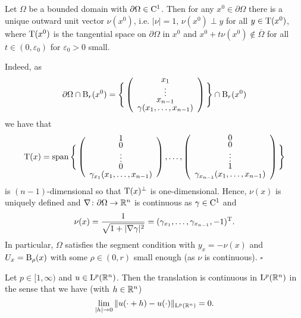 \begin{rem}
  Let $\Omega$ be a bounded domain with $\partial \Omega \in \mathrm{C}^1$.
  Then for any $x^0\in \partial\Omega$ there is a unique outward unit vector $\nu(x^0)$, i.e. $|\nu| = 1$, $\nu(x^0) \perp y$ for all $y \in \mathrm{T}(x^0)$, where $\mathrm{T}(x^0)$ is the tangential space on $\partial\Omega$ in $x^0$ and $x^0 + t\nu(x^0) \not\in\overline\Omega$ for all $t \in (0,\varepsilon_0)$ for $\varepsilon_0 > 0$ small.

  Indeed, as 
  $$
  \def\arraystretch{0.6}
  \partial\Omega \cap \BB_r(x^0) = \Bigg\{ \left( \begin{array}{c} x_1 \\ \vdots \\ x_{n - 1} \\ \gamma(x_1,\dots,x_{n-1}) \end{array} \right) \Bigg\} \cap \BB_r(x^0)
  $$
  we have that
  $$
  \def\arraystretch{0.6}
  \TT(x) = \Span \Bigg\{ 
    \left(\begin{array}{c} 1 \\ 0 \\ \vdots \\ 0 \\ \gamma_{x_1}(x_1,\dots,x_{n - 1}) \end{array} \right),
    \dots, 
    \left(\begin{array}{c} 0 \\ 0 \\ \vdots \\ 1 \\ \gamma_{x_{n-1}}(x_1,\dots,x_{n - 1}) \end{array} \right)\Bigg\}
  $$
  is $(n-1)$-dimensional so that $\mathrm{T}(x)^\perp$ is one-dimensional.
  Hence, $\nu(x)$ is uniquely defined and $\nabla \colon \partial\Omega \to \mathbb{R}^n$ is continuous as $\gamma \in \mathrm{C}^1$ and 
  $$
  \nu(x) = \frac{1}{\sqrt{1 + |\nabla \gamma|^2}} = (\gamma_{x_1},\dots,\gamma_{x_{n - 1}}, -1)^{\mathrm{T}}.
  $$
  In particular, $\Omega$ satisfies the segment condition with $y_x = -\nu(x)$ and $U_x = \mathrm{B}_\rho(x)$ with some $\rho \in (0,r)$ small enough (as $\nu$ is continuous). \hfill$\square$
\end{rem}

\begin{prop}\label{prop:continuousTrans}
  Let $p \in [1,\infty)$ and $u \in \mathrm{L}^p(\mathbb{R}^n)$. 
    Then the translation is continuous in $\mathrm{L}^p(\mathbb{R}^n)$ in the sense that we have (with $h \in \mathbb{R}^n$)
    $$
    \lim_{|h| \to 0} \| u(\cdot + h) - u(\cdot)\|_{\mathrm{L}^p(\mathbb{R}^n)} = 0.
    $$
\end{prop}

